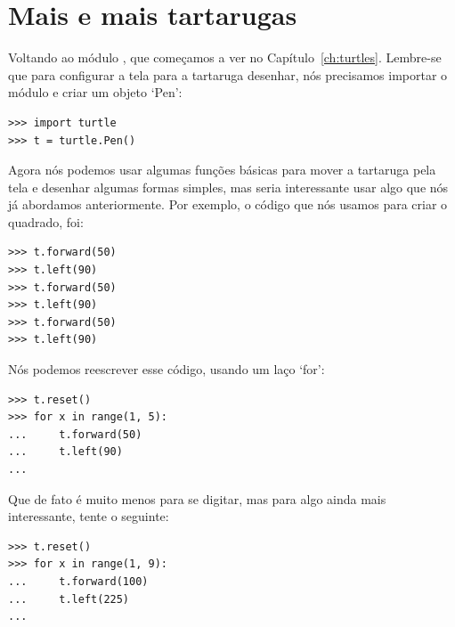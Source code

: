 

\chapter{Mais e mais tartarugas}\label{ch:turtlesgalore}

Voltando ao módulo , que começamos a ver no Capítulo~\ref{ch:turtles}. Lembre-se que para configurar a tela para a tartaruga desenhar, nós precisamos importar o módulo e criar um objeto `Pen':

\begin{listing}
\begin{verbatim}
>>> import turtle
>>> t = turtle.Pen()
\end{verbatim}
\end{listing}

Agora nós podemos usar algumas funções básicas para mover a tartaruga pela tela e desenhar algumas formas simples, mas seria interessante usar algo que nós já abordamos anteriormente. Por exemplo, o código que nós usamos para criar o quadrado, foi:

\begin{listing}
\begin{verbatim}
>>> t.forward(50)
>>> t.left(90)
>>> t.forward(50)
>>> t.left(90)
>>> t.forward(50)
>>> t.left(90)
\end{verbatim}
\end{listing} 

\noindent
Nós podemos reescrever esse código, usando um laço `for':

\begin{listing}
\begin{verbatim}
>>> t.reset()
>>> for x in range(1, 5):
...     t.forward(50)
...     t.left(90)
...
\end{verbatim}
\end{listing}

Que de fato é muito menos para se digitar, mas para algo ainda mais interessante, tente o seguinte:

\begin{listing}
\begin{verbatim}
>>> t.reset()
>>> for x in range(1, 9):
...     t.forward(100)
...     t.left(225)
...
\end{verbatim}
\end{listing}

